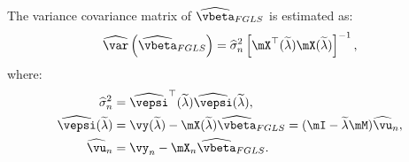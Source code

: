 The variance covariance matrix of $\widehat{\vbeta}_{FGLS}$ is estimated as:
\begin{equation*}
  \widehat{\var}\left(\widehat{\vbeta}_{FGLS}\right) = \widehat{\sigma}^2_n\left[\mX^\top(\widetilde{\lambda})\mX(\widetilde{\lambda})\right]^{-1},
\end{equation*}
%
where:
\begin{equation*}
  \begin{aligned}
    \widehat{\sigma}^2_n & = \widehat{\vepsi}^\top(\widetilde{\lambda})\widehat{\vepsi}(\widetilde{\lambda}), \\
    \widehat{\vepsi}(\widetilde{\lambda}) & = \vy(\widetilde{\lambda}) - \mX(\widetilde{\lambda})\widehat{\vbeta}_{FGLS} = (\mI-\widetilde{\lambda}\mM)\widehat{\vu}_n, \\
    \widehat{\vu}_n & = \vy_n-\mX_n\widehat{\vbeta}_{FGLS}. 
  \end{aligned}
\end{equation*}


